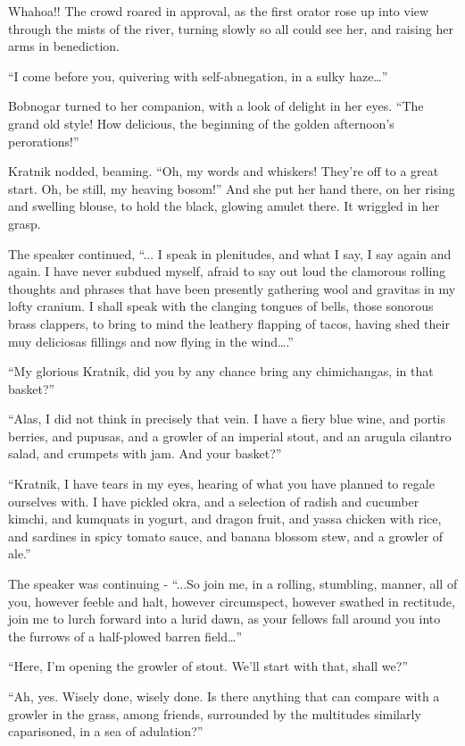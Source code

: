 Whahoa!! The crowd roared in approval, as the first orator rose up into
view through the mists of the river, turning slowly so all could see
her, and raising her arms in benediction.

``I come before you, quivering with self-abnegation, in a sulky
haze\ldots{}''

Bobnogar turned to her companion, with a look of delight in her eyes.
``The grand old style! How delicious, the beginning of the golden
afternoon's perorations!''

Kratnik nodded, beaming. ``Oh, my words and whiskers! They're off to a
great start. Oh, be still, my heaving bosom!'' And she put her hand
there, on her rising and swelling blouse, to hold the black, glowing
amulet there. It wriggled in her grasp.

The speaker continued, ``... I speak in plenitudes, and what I say, I
say again and again. I have never subdued myself, afraid to say out loud
the clamorous rolling thoughts and phrases that have been presently
gathering wool and gravitas in my lofty cranium. I shall speak with the
clanging tongues of bells, those sonorous brass clappers, to bring to
mind the leathery flapping of tacos, having shed their muy deliciosas
fillings and now flying in the wind\ldots{}.''

``My glorious Kratnik, did you by any chance bring any chimichangas, in
that basket?''

``Alas, I did not think in precisely that vein. I have a fiery blue
wine, and portis berries, and pupusas, and a growler of an imperial
stout, and an arugula cilantro salad, and crumpets with jam. And your
basket?''

``Kratnik, I have tears in my eyes, hearing of what you have planned to
regale ourselves with. I have pickled okra, and a selection of radish
and cucumber kimchi, and kumquats in yogurt, and dragon fruit, and yassa
chicken with rice, and sardines in spicy tomato sauce, and banana
blossom stew, and a growler of ale.''

The speaker was continuing - ``...So join me, in a rolling, stumbling,
manner, all of you, however feeble and halt, however circumspect,
however swathed in rectitude, join me to lurch forward into a lurid
dawn, as your fellows fall around you into the furrows of a half-plowed
barren field\ldots{}''

``Here, I'm opening the growler of stout. We'll start with that, shall
we?''

``Ah, yes. Wisely done, wisely done. Is there anything that can compare
with a growler in the grass, among friends, surrounded by the multitudes
similarly caparisoned, in a sea of adulation?''

